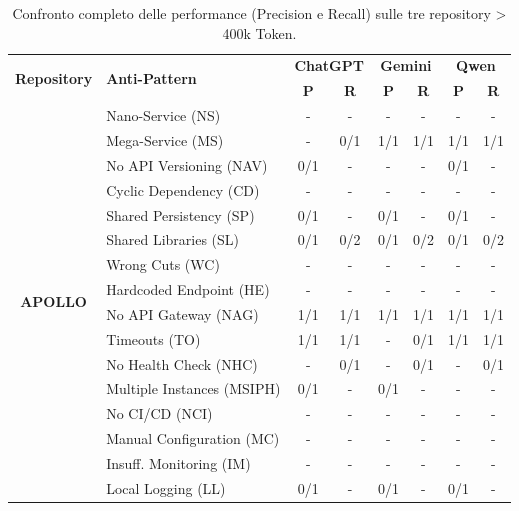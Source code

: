 \vspace{1em}
\begin{table}[H]
    \centering
    \scriptsize
    \renewcommand{\arraystretch}{1.1}
    \caption{Confronto completo delle performance (Precision e Recall) sulle tre repository > 400k Token.}
    \label{tab:large_repos_comparison_full}
    \begin{tabular}{| c | l | c c | c c | c c |}
        \hline
        \multirow{2}{*}{\textbf{Repository}} & \multirow{2}{*}{\textbf{Anti-Pattern}} & \multicolumn{2}{c|}{\textbf{ChatGPT}} & \multicolumn{2}{c|}{\textbf{Gemini}} & \multicolumn{2}{c|}{\textbf{Qwen}} \\
        & & \textbf{P} & \textbf{R} & \textbf{P} & \textbf{R} & \textbf{P} & \textbf{R} \\ \hline
        
        \multirow{16}{*}{\textbf{APOLLO}} 
        & Nano-Service (NS)           & - & - & - & - & - & - \\
        & Mega-Service (MS)           & - & 0/1 & 1/1 & 1/1 & 1/1 & 1/1 \\
        & No API Versioning (NAV)     & 0/1 & - & - & - & 0/1 & - \\
        & Cyclic Dependency (CD)      & - & - & - & - & - & - \\
        & Shared Persistency (SP)     & 0/1 & - & 0/1 & - & 0/1 & - \\
        & Shared Libraries (SL)       & 0/1 & 0/2 & 0/1 & 0/2 & 0/1 & 0/2 \\
        & Wrong Cuts (WC)             & - & - & - & - & - & - \\
        & Hardcoded Endpoint (HE)     & - & - & - & - & - & - \\
        & No API Gateway (NAG)        & 1/1 & 1/1 & 1/1 & 1/1 & 1/1 & 1/1 \\
        & Timeouts (TO)               & 1/1 & 1/1 & - & 0/1 & 1/1 & 1/1 \\
        & No Health Check (NHC)       & - & 0/1 & - & 0/1 & - & 0/1 \\
        & Multiple Instances (MSIPH)  & 0/1 & - & 0/1 & - & - & - \\
        & No CI/CD (NCI)              & - & - & - & - & - & - \\
        & Manual Configuration (MC)   & - & - & - & - & - & - \\
        & Insuff. Monitoring (IM)     & - & - & - & - & - & - \\
        & Local Logging (LL)          & 0/1 & - & 0/1 & - & 0/1 & - \\ \hline
        

\end{tabular}
\end{table}

